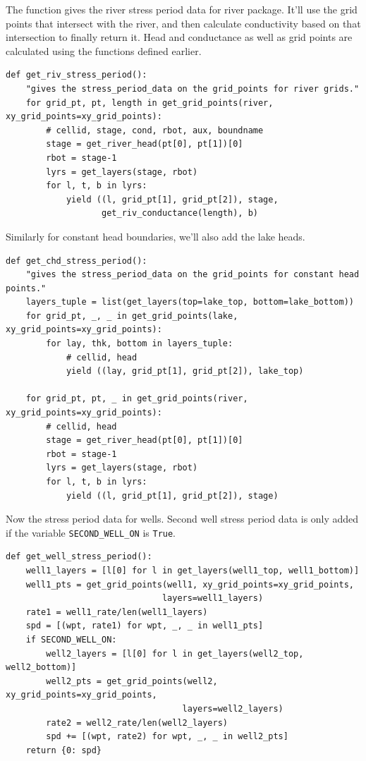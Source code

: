 \documentclass[titlepage,12pt]{unisubmission}
\begin{document}
The function gives the river stress period data for river package. It'll use the grid points that intersect with the river, and then calculate conductivity based on that intersection to finally return it. Head and conductance as well as grid points are calculated using the functions defined earlier.

\begin{verbatim}
def get_riv_stress_period():
    "gives the stress_period_data on the grid_points for river grids."
    for grid_pt, pt, length in get_grid_points(river, xy_grid_points=xy_grid_points):
        # cellid, stage, cond, rbot, aux, boundname
        stage = get_river_head(pt[0], pt[1])[0]
        rbot = stage-1
        lyrs = get_layers(stage, rbot)
        for l, t, b in lyrs:
            yield ((l, grid_pt[1], grid_pt[2]), stage,
                   get_riv_conductance(length), b)
\end{verbatim}

Similarly for constant head boundaries, we'll also add the lake heads.

\begin{verbatim}
def get_chd_stress_period():
    "gives the stress_period_data on the grid_points for constant head points."
    layers_tuple = list(get_layers(top=lake_top, bottom=lake_bottom))
    for grid_pt, _, _ in get_grid_points(lake, xy_grid_points=xy_grid_points):
        for lay, thk, bottom in layers_tuple:
            # cellid, head
            yield ((lay, grid_pt[1], grid_pt[2]), lake_top)

    for grid_pt, pt, _ in get_grid_points(river, xy_grid_points=xy_grid_points):
        # cellid, head
        stage = get_river_head(pt[0], pt[1])[0]
        rbot = stage-1
        lyrs = get_layers(stage, rbot)
        for l, t, b in lyrs:
            yield ((l, grid_pt[1], grid_pt[2]), stage)
\end{verbatim}

Now the stress period data for wells. Second well stress period data is only added if the variable \texttt{SECOND\_WELL\_ON} is \texttt{True}.

\begin{verbatim}
def get_well_stress_period():
    well1_layers = [l[0] for l in get_layers(well1_top, well1_bottom)]
    well1_pts = get_grid_points(well1, xy_grid_points=xy_grid_points,
                               layers=well1_layers)
    rate1 = well1_rate/len(well1_layers)
    spd = [(wpt, rate1) for wpt, _, _ in well1_pts]
    if SECOND_WELL_ON:
        well2_layers = [l[0] for l in get_layers(well2_top, well2_bottom)]
        well2_pts = get_grid_points(well2, xy_grid_points=xy_grid_points,
                                   layers=well2_layers)
        rate2 = well2_rate/len(well2_layers)
        spd += [(wpt, rate2) for wpt, _, _ in well2_pts]
    return {0: spd}
\end{verbatim}
\end{document}
